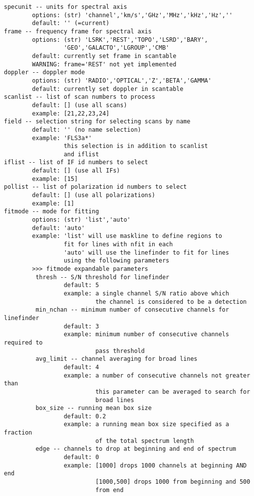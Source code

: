 \begin{verbatim}
specunit -- units for spectral axis
        options: (str) 'channel','km/s','GHz','MHz','kHz','Hz',''
        default: '' (=current)
frame -- frequency frame for spectral axis
        options: (str) 'LSRK','REST','TOPO','LSRD','BARY',
                 'GEO','GALACTO','LGROUP','CMB'
        default: currently set frame in scantable
        WARNING: frame='REST' not yet implemented
doppler -- doppler mode
        options: (str) 'RADIO','OPTICAL','Z','BETA','GAMMA'
        default: currently set doppler in scantable
scanlist -- list of scan numbers to process
        default: [] (use all scans)
        example: [21,22,23,24]
field -- selection string for selecting scans by name
        default: '' (no name selection)
        example: 'FLS3a*'
                 this selection is in addition to scanlist
                 and iflist
iflist -- list of IF id numbers to select
        default: [] (use all IFs)
        example: [15]
pollist -- list of polarization id numbers to select
        default: [] (use all polarizations)
        example: [1]
fitmode -- mode for fitting
        options: (str) 'list','auto'
        default: 'auto'
        example: 'list' will use maskline to define regions to
                 fit for lines with nfit in each
                 'auto' will use the linefinder to fit for lines
                 using the following parameters
        >>> fitmode expandable parameters
         thresh -- S/N threshold for linefinder
                 default: 5
                 example: a single channel S/N ratio above which 
                          the channel is considered to be a detection
         min_nchan -- minimum number of consecutive channels for linefinder
                 default: 3
                 example: minimum number of consecutive channels required to 
                          pass threshold
         avg_limit -- channel averaging for broad lines
                 default: 4
                 example: a number of consecutive channels not greater than
                          this parameter can be averaged to search for 
                          broad lines
         box_size -- running mean box size
                 default: 0.2
                 example: a running mean box size specified as a fraction
                          of the total spectrum length
         edge -- channels to drop at beginning and end of spectrum
                 default: 0
                 example: [1000] drops 1000 channels at beginning AND end
                          [1000,500] drops 1000 from beginning and 500 
                          from end


\end{verbatim}
